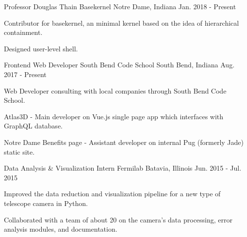 \begin{cventries}
  \cventry
    {Professor Douglas Thain}
    {Basekernel}
    {Notre Dame, Indiana}
    {Jan. 2018 - Present}
    {
      \begin{cvitems}
        \item {Contributor for basekernel, an minimal kernel based on the idea of hierarchical containment.}
        \item {Designed user-level shell.}
        \item {\href{https://github.com/dthain/basekernel}{\faGithubSquare\acvHeaderIconSep\@Basekernel}}
      \end{cvitems}
    }
  \cventry
    {Frontend Web Developer}
    {South Bend Code School}
    {South Bend, Indiana}
    {Aug. 2017 - Present}
    {
      \begin{cvitems}
        \item {Web Developer consulting with local companies through South Bend Code School.}
        \item {Atlas3D - Main developer on Vue.js single page app which interfaces with GraphQL database.}
        \item {{Notre Dame Benefits page} - Assistant developer on internal Pug (formerly Jade) static site.\\}
      \end{cvitems}
    }
  \cventry
    {Data Analysis \& Visualization Intern}
    {Fermilab}
    {Batavia, Illinois}
    {Jun. 2015 - Jul. 2015}
    {
      \begin{cvitems}
        \item {Improved the data reduction and visualization pipeline for a new type
of telescope camera in Python.}
        \item {Collaborated with a team of about 20 on the camera’s data processing, error analysis modules, and documentation.}
      \end{cvitems}
    }
\end{cventries}
\iffalse
  \cventry
    {Donation Facilitator}
    {Notre Dame Alumni Center}
    {Notre Dame, Indiana}
    {Sep. 2016 - May. 2017}
    {
      \begin{cvitems}
        \item {Facilitated financial contributions to the University for various causes and campaigns.}
        \item {Exceeded the average amount of donations by more than 17\% in every report.}
      \end{cvitems}
    }
\fi
